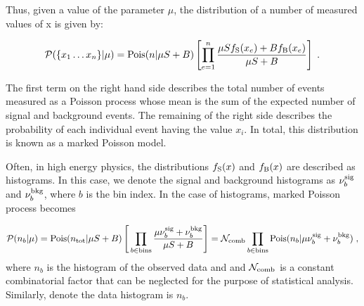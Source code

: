 Thus, given a value of the parameter $\mu$, the distribution of a number of measured values of x is given by:

\begin{eqnarray}
{\cal P}(\{x_1\dots x_n\} | \mu) = \textrm{Pois}(n | \mu S+B) \left[ \prod_{e=1}^n \frac{\mu S f_{\rm S}(x_e) + B f_{\rm B}(x_e)}{\mu S+B}\right ] \; .
\end{eqnarray}

The first term on the right hand side describes the total number of events measured as a Poisson process whose mean is the sum of the expected number of signal and background events.
The remaining of the right side describes the probability of each individual event having the value $x_i$.
In total, this distribution is known as a marked Poisson model.

Often, in high energy physics, the distributions $f_{\rm S}(x)$ and $f_{\rm B}(x)$ are described as histograms.
In this case, we denote the signal and background histograms as $\nu_b^{\rm sig}$ and $\nu_b^{\rm bkg}$, where $b$ is the bin index.
In the case of histograms,  marked Poisson process becomes

\begin{eqnarray}
{\cal P}(n_b |\mu)=  \textrm{Pois}(n_{\rm tot} | \mu S + B) \left[\, \prod_{b\in\rm bins}\frac{\mu \nu_b^{\rm sig} + \nu_b^{\rm bkg}}{\mu S + B}\right ] = \mathcal{N}_{\rm comb} \prod_{b\in\rm bins} \textrm{Pois}(n_b | \mu \nu_{b}^{\rm sig} + \nu_{b}^{\rm bkg}) \; ,
\label{eqn:histpois}
\end{eqnarray}
where $n_b$ is the histogram of the observed data and and $\mathcal{N}_{\rm comb}$ is a constant combinatorial factor that can be neglected for the purpose of statistical analysis.   
Similarly, denote the data histogram is $n_b$.


